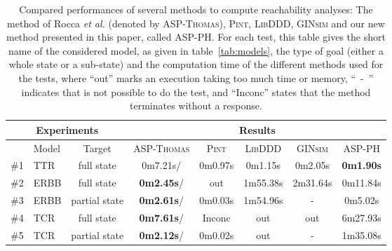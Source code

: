 \begin{table*}[ht]
\begin{center}
\noindent%
\begin{tabular}{|l|l|c||c|c|c|c|c|}
\hline
  \multicolumn{3}{|c||}{Experiments} & \multicolumn{5}{c|}{Results} \\
\hline
  & Model & Target & \textsc{ASP-Thomas} & \textsc{Pint} & \textsc{LibDDD} & \textsc{GINsim} & \textsc{ASP-PH} \\
\hline
\hline
  \#1 & TTR & full state & 0m7.21s/ & 0m0.97s & 0m1.15s &  0m2.05s & {\bf 0m1.90s} \\
\hline
  \#2 & ERBB & full state & {\bf 0m2.45s}/ & out &1m55.38s & 2m31.64s & 0m11.84s \\
\hline
  \#3 & ERBB & partial state & {\bf 0m2.61s}/ & 0m0.03s &1m54.96s & - & 0m5.02s \\
\hline
  \#4 & TCR & full state & {\bf 0m7.61s}/ & Inconc & out & out & 6m27.93s \\
\hline
  \#5 & TCR & partial state & {\bf 0m2.12s}/ & 0m0.02s & out & - & 1m35.08s \\
\hline
\end{tabular}
\vspace*{4pt}
\caption{\label{tab:reachability}
Compared performances of several methods to compute reachability analyses:
The method of Rocca \textit{et al.} (denoted by \textsc{ASP-Thomas}), \textsc{Pint}, \textsc{LibDDD}, \textsc{GINsim} and our new method presented in this paper, called \textsc{ASP-PH}.
For each test, this table gives the short name of the considered model,
as given in table~\ref{tab:models},
the type of goal (either a whole state or a sub-state)
and the computation time of the different methods used for the tests,
where “out” marks an execution taking too much time or memory,
\mbox{“~-~”} indicates that is not possible to do the test,
and “Inconc” states that the method terminates without a response.
}
\end{center}
\end{table*}



